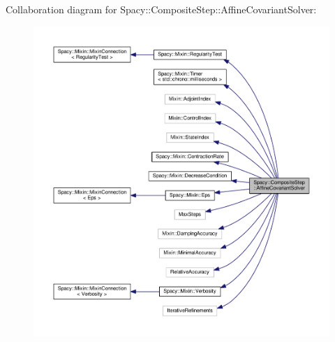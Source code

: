 Collaboration diagram for Spacy\+:\+:Composite\+Step\+:\+:Affine\+Covariant\+Solver\+:
\nopagebreak
\begin{figure}[H]
\begin{center}
\leavevmode
\includegraphics[width=350pt]{classSpacy_1_1CompositeStep_1_1AffineCovariantSolver__coll__graph}
\end{center}
\end{figure}
